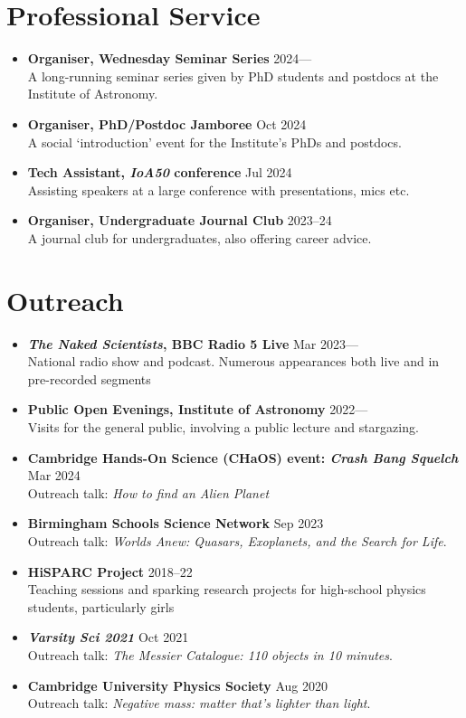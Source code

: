 \documentclass[a4paper,10pt]{article}
\begin{document}
\section*{Professional Service}

\begin{itemize}
\item \textbf{Organiser, Wednesday Seminar Series}
\hfill 2024---\\
A long-running seminar series given by PhD students and postdocs at the Institute of Astronomy.
\item \textbf{Organiser, PhD/Postdoc Jamboree}
\hfill Oct 2024\\
A social `introduction' event for the Institute's PhDs and postdocs.
\item \textbf{Tech Assistant, \textit{IoA50} conference}
\hfill Jul 2024\\
Assisting speakers at a large conference with presentations, mics etc.
\item \textbf{Organiser, Undergraduate Journal Club} \hfill 2023--24\\
A journal club for undergraduates, also offering career advice.
\end{itemize}

\section*{Outreach}

\begin{itemize}
    \item \textbf{\textit{The Naked Scientists}, BBC Radio 5 Live}
    \hfill Mar 2023---\\
    National radio show and podcast. Numerous appearances both live and in pre-recorded segments
    \item \textbf{Public Open Evenings, Institute of Astronomy}
    \hfill 2022---\\
    Visits for the general public, involving a public lecture and stargazing.
    \item \textbf{Cambridge Hands-On Science (CHaOS) event: \textit{Crash Bang Squelch}}
    \hfill Mar 2024\\
    Outreach talk: \textit{How to find an Alien Planet}
    \item \textbf{Birmingham Schools Science Network}
    \hfill Sep 2023\\
    Outreach talk: \textit{Worlds Anew: Quasars, Exoplanets, and the Search for Life}.
    \item \textbf{HiSPARC Project}
    \hfill 2018--22\\
    Teaching sessions and sparking research projects for high-school physics students, particularly girls
    \item \textbf{\textit{Varsity Sci 2021}}
    \hfill Oct 2021\\
    Outreach talk: \textit{The Messier Catalogue: 110 objects in 10 minutes}.
    \item \textbf{Cambridge University Physics Society}
    \hfill Aug 2020\\
    Outreach talk: \textit{Negative mass: matter that's lighter than light}.
\end{itemize}
\end{document}
